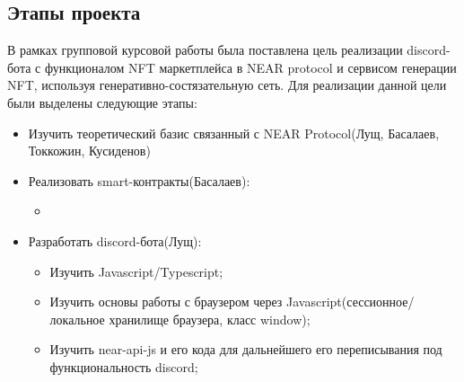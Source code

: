 \subsection{Этапы проекта}
В рамках групповой курсовой работы была поставлена цель реализации discord-бота с функционалом NFT маркетплейса в NEAR protocol и сервисом генерации NFT, используя генеративно-состязательную сеть. Для реализации данной цели были выделены следующие этапы:
\begin{itemize}
    \item Изучить теоретический базис связанный с NEAR Protocol(Лущ, Басалаев, Токкожин, Кусиденов)
    \item Реализовать smart-контракты(Басалаев):
    \begin{itemize}
        \item
    \end{itemize}
    \item Разработать discord-бота(Лущ):
    \begin{itemize}
        \item Изучить Javascript/Typescript;
        \item Изучить основы работы с браузером через Javascript(сессионное/локальное хранилище браузера, класс window);
        \item Изучить near-api-js и его кода для дальнейшего его переписывания под функциональность discord;

\end{itemize}
\end{itemize}
